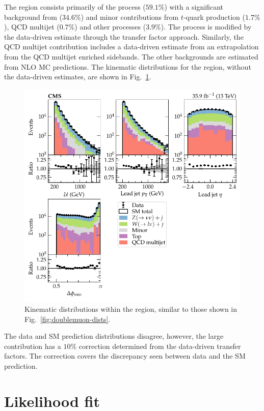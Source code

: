 The \metplusjets region consists primarily of the \IZvvj process ($59.1\%$) with a significant background from \IWlvj ($34.6\%$) and minor contributions from $t$-quark production ($1.7\%$), QCD multijet ($0.7\%$) and other processes ($3.9\%$). The \IWlvj process is modified by the data-driven estimate through the transfer factor approach. Similarly, the QCD multijet contribution includes a data-driven estimate from an extrapolation from the QCD multijet enriched sidebands. The other backgrounds are estimated from NLO MC predictions. The kinematic distributions for the \metplusjets region, without the data-driven estimates, are shown in Fig.~\ref{fig:monojet-dists}.
%
\begin{figure}[htb]
    \centering
    \includegraphics{chapters/043_results/images/monojet_dists.pdf}
    \caption[\metplusjets kinematics.]{
        Kinematic distributions within the \metplusjets region, similar to those shown in Fig.~\ref{fig:doublemuon-dists}.
    }
    \label{fig:monojet-dists}
\end{figure}
%
The data and SM prediction distributions disagree, however, the large \IWlvj contribution has a $10\%$ correction determined from the data-driven transfer factors. The correction covers the discrepancy seen between data and the SM prediction.


\section{Likelihood fit}

